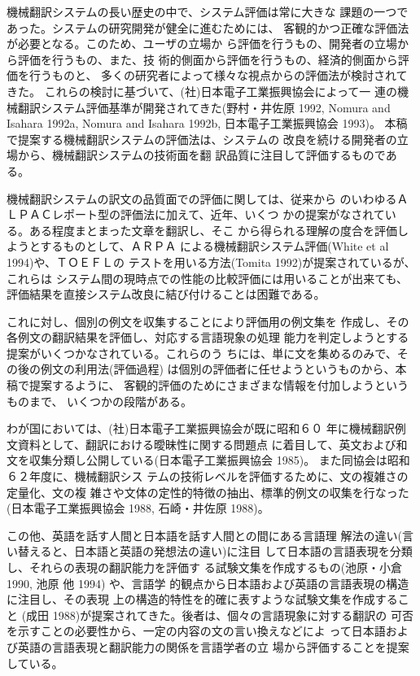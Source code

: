 機械翻訳システムの長い歴史の中で、システム評価は常に大きな
課題の一つであった。システムの研究開発が健全に進むためには、
客観的かつ正確な評価法が必要となる。このため、ユーザの立場か
ら評価を行うもの、開発者の立場から評価を行うもの、また、技
術的側面から評価を行うもの、経済的側面から評価を行うものと、
多くの研究者によって様々な視点からの評価法が検討されてきた。
これらの検討に基づいて、(社)日本電子工業振興協会によって一
連の機械翻訳システム評価基準が開発されてきた(野村・井佐原 1992,
Nomura and Isahara 1992a,  
Nomura and Isahara 1992b, 日本電子工業振興協会 1993)。
本稿で提案する機械翻訳システムの評価法は、システムの
改良を続ける開発者の立場から、機械翻訳システムの技術面を翻
訳品質に注目して評価するものである。

機械翻訳システムの訳文の品質面での評価に関しては、従来から
のいわゆるＡＬＰＡＣレポート型の評価法に加えて、近年、いくつ
かの提案がなされている。ある程度まとまった文章を翻訳し、そこ
から得られる理解の度合を評価しようとするものとして、ＡＲＰＡ
による機械翻訳システム評価(White et al 1994)や、ＴＯＥＦＬの
テストを用いる方法(Tomita 1992)が提案されているが、これらは
システム間の現時点での性能の比較評価には用いることが出来ても、
評価結果を直接システム改良に結び付けることは困難である。

これに対し、個別の例文を収集することにより評価用の例文集を
作成し、その各例文の翻訳結果を評価し、対応する言語現象の処理
能力を判定しようとする提案がいくつかなされている。これらのう
ちには、単に文を集めるのみで、その後の例文の利用法(評価過程)
は個別の評価者に任せようというものから、本稿で提案するように、
客観的評価のためにさまざまな情報を付加しようというものまで、
いくつかの段階がある。

わが国においては、(社)日本電子工業振興協会が既に昭和６０
年に機械翻訳例文資料として、翻訳における曖昧性に関する問題点
に着目して、英文および和文を収集分類し公開している(日本電子工業振興協会
1985)。
また同協会は昭和６２年度に、機械翻訳シス 
テムの技術レベルを評価するために、文の複雑さの定量化、文の複
雑さや文体の定性的特徴の抽出、標準的例文の収集を行なった
(日本電子工業振興協会 1988, 石崎・井佐原 1988)。

この他、英語を話す人間と日本語を話す人間との間にある言語理
解法の違い(言い替えると、日本語と英語の発想法の違い)に注目
して日本語の言語表現を分類し、それらの表現の翻訳能力を評価す
る試験文集を作成するもの(池原・小倉 1990, 池原 他 1994)
や、言語学
的観点から日本語および英語の言語表現の構造に注目し、その表現
上の構造的特性を的確に表すような試験文集を作成すること
(成田 1988)が提案されてきた。後者は、個々の言語現象に対する翻訳の
可否を示すことの必要性から、一定の内容の文の言い換えなどによ
って日本語および英語の言語表現と翻訳能力の関係を言語学者の立
場から評価することを提案している。

